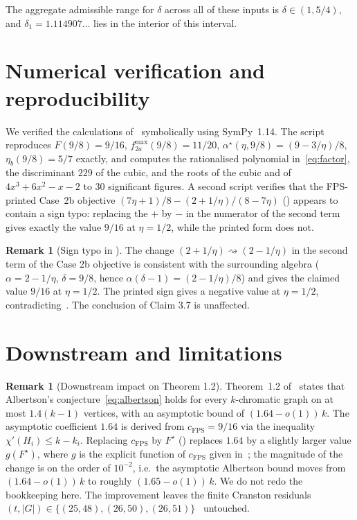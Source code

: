 \documentclass[11pt,a4paper]{article}
\theoremstyle{definition}
\newtheorem{remark}[theorem]{Remark}
\newcommand{\cFPS}{c_{\mathrm{FPS}}}
\newcommand{\chip}{\chi'}
\begin{document}
The aggregate admissible range for $\delta$ across all of these inputs
is $\delta\in(1,5/4)$, and $\delta_1=1.114907\ldots$ lies in the
interior of this interval.

\section{Numerical verification and reproducibility}\label{sec:numerics}

We verified the calculations of~ symbolically
using SymPy~1.14. The script reproduces $F(9/8)=9/16$,
$f_{2a}^{\max}(9/8)=11/20$, $\alpha^{\star}(\eta,9/8)=(9-3/\eta)/8$,
$\eta_b(9/8)=5/7$ exactly, and computes the rationalised polynomial
in~\eqref{eq:factor}, the discriminant $229$ of the cubic, and the
roots of the cubic and of $4x^3+6x^2-x-2$ to 30 significant figures.
A second script verifies that the FPS-printed Case~2b objective
$(7\eta+1)/8-(2+1/\eta)/(8-7\eta)$ (\cite[p.~10]{FPS}) appears to
contain a sign typo: replacing the $+$ by $-$ in the numerator of the
second term gives exactly the value $9/16$ at $\eta=1/2$, while the
printed form does not.

\begin{remark}[Sign typo in {\cite[p.~10]{FPS}}]\label{rem:sign}
The change $(2+1/\eta)\rightsquigarrow(2-1/\eta)$ in the second term
of the Case 2b objective is consistent with the surrounding algebra
($\alpha=2-1/\eta$, $\delta=9/8$, hence $\alpha(\delta-1)=(2-1/\eta)/8$)
and gives the claimed value $9/16$ at $\eta=1/2$. The printed sign
gives a negative value at $\eta=1/2$, contradicting~\cite[Claim 3.7]{FPS}.
The conclusion of Claim 3.7 is unaffected.
\end{remark}

\section{Downstream and limitations}\label{sec:remarks}

\begin{remark}[Downstream impact on \cite{FPS} Theorem 1.2]\label{rem:downstream}
Theorem~1.2 of~\cite{FPS} states that Albertson's
conjecture~\eqref{eq:albertson} holds for every $k$-chromatic graph on
at most $1.4(k-1)$ vertices, with an asymptotic bound of
$(1.64-o(1))\,k$. The asymptotic coefficient $1.64$ is derived
from $\cFPS=9/16$ via the inequality
$\chip(H_i)\le k-k_i$. Replacing $\cFPS$ by $F^{\star}$
() replaces $1.64$ by a slightly larger value
$g(F^{\star})$, where $g$ is the explicit function of $\cFPS$ given
in~\cite[\S 2]{FPS}; the magnitude of the change is on the order of
$10^{-2}$, i.e.\ the asymptotic Albertson bound moves from
$(1.64-o(1))\,k$ to roughly $(1.65-o(1))\,k$. We do not redo the
bookkeeping here. The improvement leaves the finite Cranston
residuals $(t,|G|)\in\{(25,48),(26,50),(26,51)\}$~\cite{Cranston}
untouched.
\end{remark}
\end{document}
